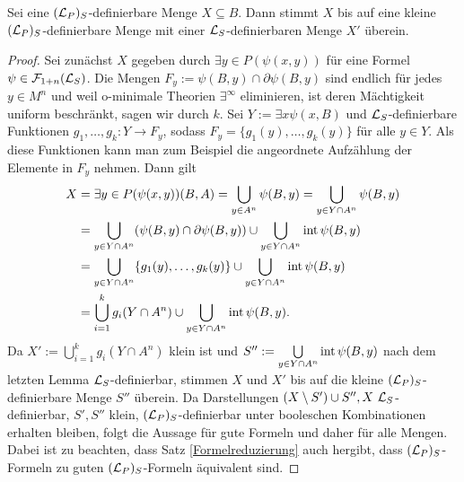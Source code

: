 \begin{lemma}
	Sei eine $(\mathcal{L}_P)_S$-definierbare Menge $X\subseteq B$. Dann stimmt $X$ bis auf eine kleine $(\mathcal{L}_P)_S$-definierbare Menge mit einer $\mathcal{L}_S$-definierbaren Menge $X'$ überein.
\end{lemma}
\begin{proof}
	Sei zunächst $X$ gegeben durch $\exists y\in P(\psi(x,y))$ für eine Formel $\psi\in\mathcal{F}_{1+n}(\mathcal{L}_S)$. Die Mengen $F_y:=\psi(B,y)\cap\partial\psi(B,y)$ sind endlich für jedes $y\in M^n$ und weil o-minimale Theorien $\exists^\infty$ eliminieren, ist deren Mächtigkeit uniform beschränkt, sagen wir durch $k$. Sei $Y:=\exists x\psi(x,B)$ und $\mathcal{L}_S$-definierbare Funktionen $g_1,\dots,g_k:Y\rightarrow F_y$, sodass $F_y=\{g_1(y),\dots,g_k(y)\}$ für alle $y\in Y$. Als diese Funktionen kann man zum Beispiel die angeordnete Aufzählung der Elemente in $F_y$ nehmen. Dann gilt
	\begin{align*}
	X&=\exists y\in P(\psi(x,y))(B,A)=\bigcup\limits_{y\in A^n}\psi(B,y)=\bigcup\limits_{y\in Y\cap A^n}\psi(B,y)\\&=\bigcup\limits_{y\in Y\cap A^n}(\psi(B,y)\cap \partial\psi(B,y))\cup\bigcup\limits_{y\in Y\cap A^n}\operatorname{int}\psi(B,y)\\&=\bigcup\limits_{y\in Y\cap A^n}\{g_1(y),\dots,g_k(y)\}\cup\bigcup\limits_{y\in Y\cap A^n}\operatorname{int}\psi(B,y)\\&=\bigcup\limits_{i=1}^kg_i(Y\cap A^n)\cup \bigcup\limits_{y\in Y\cap A^n}\operatorname{int}\psi(B,y).
	\end{align*}
	Da $X':=\bigcup\limits_{i=1}^kg_i(Y\cap A^n)$ klein ist und $S'':=\bigcup\limits_{y\in Y\cap A^n}\operatorname{int}\psi(B,y)$ nach dem letzten Lemma $\mathcal{L}_S$-definierbar, stimmen $X$ und $X'$ bis auf die kleine $(\mathcal{L}_P)_S$-definierbare Menge $S''$ überein. Da Darstellungen \glqq{}$(X\setminus  S')\cup S'',X\ \lingua_S$-definierbar, $S',S''$ klein, $(\mathcal{L}_P)_S$-definierbar\grqq{} unter booleschen Kombinationen erhalten bleiben, folgt die Aussage für gute Formeln und daher für alle Mengen. Dabei ist zu beachten, dass Satz \ref{Formelreduzierung} auch hergibt, dass $(\mathcal{L}_P)_S$-Formeln zu guten $(\mathcal{L}_P)_S$-Formeln äquivalent sind.
\end{proof}

